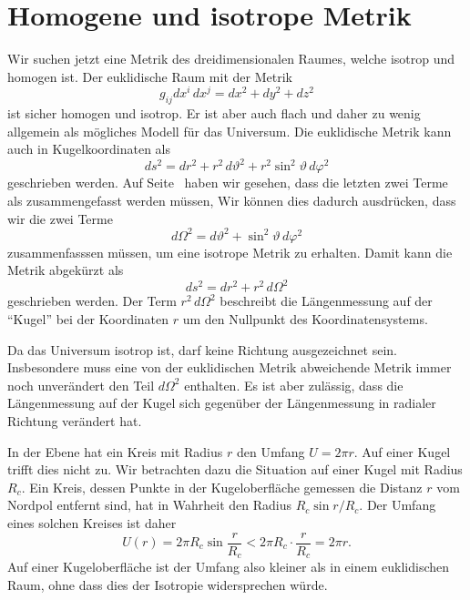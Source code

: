 \section{Homogene und isotrope Metrik%
\label{skript:robertson:himetrik}}
Wir suchen jetzt eine Metrik des dreidimensionalen Raumes, welche
isotrop und homogen ist.
Der euklidische Raum mit der Metrik
\[
g_{ij}dx^i\,dx^j
=
dx^2 + dy^2 + dz^2
\]
ist sicher homogen und isotrop. 
Er ist aber auch flach und daher zu wenig allgemein als mögliches
Modell für das Universum.
Die euklidische Metrik kann auch in Kugelkoordinaten als
\begin{equation}
ds^2
=
dr^2
+ 
r^2\,d\vartheta^2
+
r^2\sin^2\vartheta\,d\varphi^2
\label{skript:rwmetrik:kugelkoordinaten}
\end{equation}
geschrieben werden.
Auf Seite~\pageref{skript:laengenmessung:section:isotropie}
haben wir gesehen, dass die letzten zwei Terme als zusammengefasst
werden müssen,
Wir können dies dadurch ausdrücken, dass wir die zwei Terme
\[
d\Omega^2 = d\vartheta^2 + \sin^2\vartheta\,d\varphi^2
\]
zusammenfasssen müssen, um eine isotrope Metrik zu erhalten.
Damit kann die Metrik abgekürzt als
\begin{equation}
ds^2 = dr^2 + r^2\,d\Omega^2
\end{equation}
geschrieben werden.
Der Term $r^2\,d\Omega^2$ beschreibt die Längenmessung auf der
``Kugel'' bei der Koordinaten $r$ um den Nullpunkt des
Koordinatensystems.

Da das Universum isotrop ist, darf keine Richtung ausgezeichnet sein.
Insbesondere muss eine von der euklidischen Metrik abweichende
Metrik immer noch unverändert den Teil $d\Omega^2$ enthalten.
Es ist aber zulässig, dass die Längenmessung auf der Kugel sich
gegenüber der Längenmessung in radialer Richtung verändert hat.

In der Ebene hat ein Kreis mit Radius $r$ den Umfang $U=2\pi r$.
Auf einer Kugel trifft dies nicht zu.
Wir betrachten dazu die Situation auf einer Kugel mit Radius $R_c$.
Ein Kreis, dessen Punkte in der Kugeloberfläche gemessen die
Distanz $r$ vom Nordpol
entfernt sind, hat in Wahrheit den Radius $R_c \sin r/R_c$.
Der Umfang eines solchen Kreises ist daher
\[
U(r) = 2\pi R_c\sin \frac{r}{R_c} < 2\pi R_c\cdot\frac{r}{R_c}=2\pi r.
\]
Auf einer Kugeloberfläche ist der Umfang also kleiner als in einem
euklidischen Raum, ohne dass dies der Isotropie widersprechen würde.

